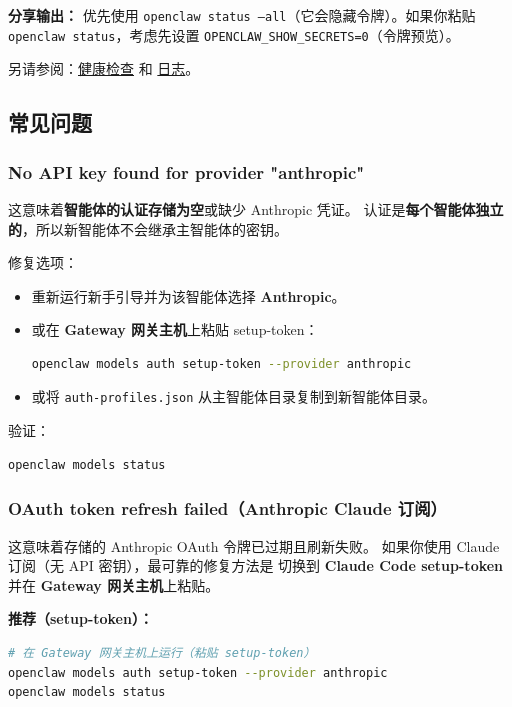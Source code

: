 \textbf{分享输出：} 优先使用 \texttt{openclaw status --all}（它会隐藏令牌）。如果你粘贴 \texttt{openclaw status}，考虑先设置 \texttt{OPENCLAW\_SHOW\_SECRETS=0}（令牌预览）。

另请参阅：\href{/gateway/health}{健康检查} 和 \href{/logging}{日志}。

\subsection{常见问题}


\subsubsection{No API key found for provider "anthropic"}


这意味着\textbf{智能体的认证存储为空}或缺少 Anthropic 凭证。
认证是\textbf{每个智能体独立的}，所以新智能体不会继承主智能体的密钥。

修复选项：

\begin{itemize}
  \item 重新运行新手引导并为该智能体选择 \textbf{Anthropic}。
  \item 或在 \textbf{Gateway 网关主机}上粘贴 setup-token：
\begin{lstlisting}[language=bash]
  openclaw models auth setup-token --provider anthropic
\end{lstlisting}

  \item 或将 \texttt{auth-profiles.json} 从主智能体目录复制到新智能体目录。
\end{itemize}


验证：

\begin{lstlisting}[language=bash]
openclaw models status
\end{lstlisting}


\subsubsection{OAuth token refresh failed（Anthropic Claude 订阅）}


这意味着存储的 Anthropic OAuth 令牌已过期且刷新失败。
如果你使用 Claude 订阅（无 API 密钥），最可靠的修复方法是
切换到 \textbf{Claude Code setup-token} 并在 \textbf{Gateway 网关主机}上粘贴。

\textbf{推荐（setup-token）：}

\begin{lstlisting}[language=bash]
# 在 Gateway 网关主机上运行（粘贴 setup-token）
openclaw models auth setup-token --provider anthropic
openclaw models status
\end{lstlisting}



